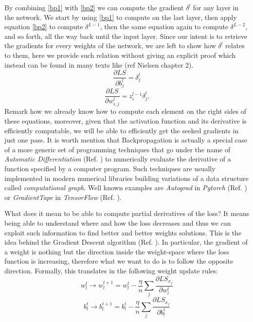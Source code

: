 \documentclass[LaM,binding=0.6cm]{./packages/sapthesis/sapthesis}
\begin{document}
                By combining \ref{bp1} with \ref{bp2} we can compute the gradient $\delta^{l}$ for any layer in the network. We start by using \ref{bp1} to compute on the last layer, 
                then apply equation \ref{bp2} to compute $\delta^{L-1}$, then the same equation again to compute $\delta^{L-2}$, and so forth, 
                all the way back until the input layer. Since our intent is to retrieve the gradients for every weights of the network, we are left to 
                show how $ \delta^l $ relates to them, here we provide such relation without giving an explicit proof which instead can be found in many
                texts like (ref Nielsen chapter 2).
                \begin{equation}
                    \frac{\partial LS}{\partial b^{l}_{j}} = \delta^{l}_{j}
                \end{equation}
                \begin{equation}
                    \frac{\partial LS}{\partial w^{l}_{i,j}} = z^{l-1}_i \delta^{l}_{j}.
                \end{equation}
                Remark how we already know how to compute each element on the right sides of these equations, moreover, given that the activation function
                and its derivative is efficiently computable, we will be able to efficiently get the seeked gradients in just one pass.
                It is worth mention that Backpropagation is actually a special case of a more generic set of programming techniques that go under
                the name of \textit{Automatic Differentiation} (Ref. ) to numerically evaluate the derivative of a function specified by a computer program.
                Such techniques are usually implemented in modern numerical libraries building variations of a data structure called \textit{computational graph}.
                Well known examples are \textit{Autograd} in \textit{Pytorch} (Ref. ) or \textit{GradientTape} in \textit{TensorFlow} (Ref. ).

               What does it mean to be able to compute partial derivatives of the loss? It means being able to understand where and how 
               the loss decreases and thus we can exploit such information to find better and better weights solutions. 
               This is the idea behind the Gradient Descent algorithm (Ref. ). In particular, the gradient of a weight is nothing but the
               direction inside the weight-space where the loss function is increasing, therefore what we want to do is to follow the opposite
               direction. Formally, this translates in the following weight update rules:
               \begin{equation}
                    w^{t}_{l} \rightarrow w_{l}^{t+1}=w^{t}_{l}-\frac{\eta}{n} \sum_{j} \frac{\partial LS_{x_{j}}}{\partial w^{t}_{l}}
               \end{equation}
               \begin{equation}
                b^{t}_{l} \rightarrow b^{t+1}_{l}=b^{t}_{l}-\frac{\eta}{n} \sum_{j} \frac{\partial LS_{x_{j}}}{\partial b^{t}_{l}}
               \end{equation}
\end{document}
